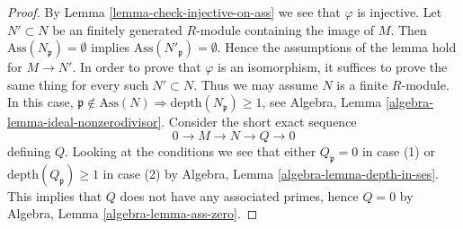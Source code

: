 \documentclass[10pt,a4paper]{amsart}
\theoremstyle{plain}
\theoremstyle{definition}
\theoremstyle{remark}
\numberwithin{equation}{subsection}
\begin{document}
\begin{proof}
By Lemma \ref{lemma-check-injective-on-ass} we see that $\varphi$ is injective.
Let $N' \subset N$ be an finitely generated $R$-module containing
the image of $M$. Then $\text{Ass}(N_\mathfrak p) = \emptyset$ implies
$\text{Ass}(N'_\mathfrak p) = \emptyset$.
Hence the assumptions of the lemma hold for $M \to N'$.
In order to prove that $\varphi$ is an isomorphism, it suffices
to prove the same thing for every such $N' \subset N$. Thus we may
assume $N$ is a finite $R$-module. In this case,
$\mathfrak p \not \in \text{Ass}(N) \Rightarrow
\text{depth}(N_\mathfrak p) \geq 1$, see
Algebra, Lemma \ref{algebra-lemma-ideal-nonzerodivisor}.
Consider the short exact sequence
$$
0 \to M \to N \to Q \to 0
$$
defining $Q$.
Looking at the conditions we see that either $Q_\mathfrak p = 0$
in case (1) or $\text{depth}(Q_\mathfrak p) \geq 1$ in case (2)
by Algebra, Lemma \ref{algebra-lemma-depth-in-ses}.
This implies that $Q$ does not have any associated primes, hence $Q = 0$ by
Algebra, Lemma \ref{algebra-lemma-ass-zero}.
\end{proof}
\end{document}
